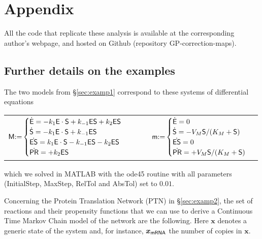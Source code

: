 \documentclass[runningheads,a4paper]{llncs}
\newcommand{\bM}{{\sf{M}}}
\newcommand{\bm}{{\sf{m}}}
\newcommand{\xx}{\boldsymbol{x}}
\newcommand{\MATLAB}{{\sf MATLAB}}
\newcommand{\deriv}[1]{\dot{{#1}}}
\newcommand{\E}{{\sf{E}}}
\newcommand{\ES}{{{\sf{ES}}} }
\newcommand{\SU}{{{\sf{S}}}}
\newcommand{\PR}{{{\sf{PR}}}}
\newcommand{\PTN}{{\sf PTN}}
\newcommand{\RNA}{{\sf{mRNA}}}
\begin{document}

\appendix

\section{Appendix}

All the code that replicate these analysis is available at  the corresponding author's webpage, and hosted on {\sf Github} (repository {\sf  GP-correction-maps}).

\subsection{Further details on the examples} \label{sec:app_ex}


The two models from \S \ref{sec:examp1} correspond to these systems of  differential equations
\begin{center}
\begin{tabular}{cc}
${\bM} {:=} 
\begin{cases} 
\deriv{\E{}}  =  -k_1 \E{} \cdot \SU{} + k_{-1} \ES{} + k_2 \ES{}\\
\deriv{\SU{}}  =  -k_1 \E{}  \cdot\SU{} + k_{-1} \ES{} \\
\deriv{\ES{}}  =  k_1 \E{} \cdot  \SU{} - k_{-1} \ES{} - k_2 \ES{}\\
\deriv{\PR{}}  =   + k_2 \ES{}\\
\end{cases}
\qquad$ &
${\bm} {:=}
\begin{cases} 
\deriv{\E{}}  =  0\\
\deriv{\SU{}}  =  - V_M\SU{} / (K_M + \SU{})  \\
\deriv{\ES{}}  = 0\\
\deriv{\PR{}}  =   + V_M\SU{} / (K_M + \SU{}) \\
\end{cases}
$\end{tabular}
\end{center}
which we solved in \MATLAB{} with the {\sf ode45} routine with all parameters ({\sf InitialStep},  {\sf MaxStep}, {\sf RelTol} and {\sf AbsTol}) set to $0.01$. 

 Concerning the Protein Translation Network (\PTN{}) in \S \ref{sec:examp2},  the set of reactions and their propensity functions that we can use to derive a Continuous Time Markov Chain model of the network are the following. Here $\xx$ denotes a generic state of the system and, for instance,  $\xx_\RNA{}$ the number of \RNA{} copies in $\xx$.
 
\end{document}
